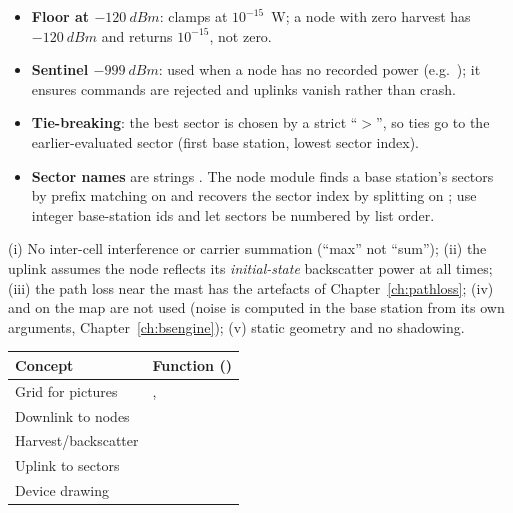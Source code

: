 \begin{itemize}
 \item \textbf{Floor at $\SI{-120}{dBm}$}:  clamps at $10^{-15}$~W; a node with zero harvest has $\SI{-120}{dBm}$ and  returns $10^{-15}$, not zero.
 \item \textbf{Sentinel $\SI{-999}{dBm}$}: used when a node has no recorded power (e.g.\ ); it ensures commands are rejected and uplinks vanish rather than crash.
 \item \textbf{Tie-breaking}: the best sector is chosen by a strict ``$>$'', so ties go to the earlier-evaluated sector (first base station, lowest sector index).
 \item \textbf{Sector names} are strings . The node module finds a base station's sectors by prefix matching on  and recovers the sector index by splitting on ; use integer base-station ids and let sectors be numbered by list order.
\end{itemize}

\begin{reality}
(i) No inter-cell interference or carrier summation (``max'' not ``sum''); (ii) the uplink assumes the node reflects its \emph{initial-state} backscatter power at all times; (iii) the path loss near the mast has the artefacts of Chapter~\ref{ch:pathloss}; (iv)  and  on the map are not used (noise is computed in the base station from its own arguments, Chapter~\ref{ch:bsengine}); (v) static geometry and no shadowing.
\end{reality}

\begin{codemap}
\small
\begin{tabularx}{\linewidth}{@{}>{\ttfamily}p{5.0cm}X@{}}
\toprule
\normalfont\bfseries Concept & \normalfont\bfseries Function (\file{propagation.py})\\
\midrule
Grid for pictures & \codew{compute_coverage_map}, \code{plot_rssi}\\
Downlink to nodes & \codew{compute_bs_to_point}\\
Harvest/backscatter & \codew{calculate_node_power}\\
Uplink to sectors & \codew{compute_point_to_bs}\\
Device drawing & \codew{_draw_radio_devices}\\
\bottomrule
\end{tabularx}
\end{codemap}

